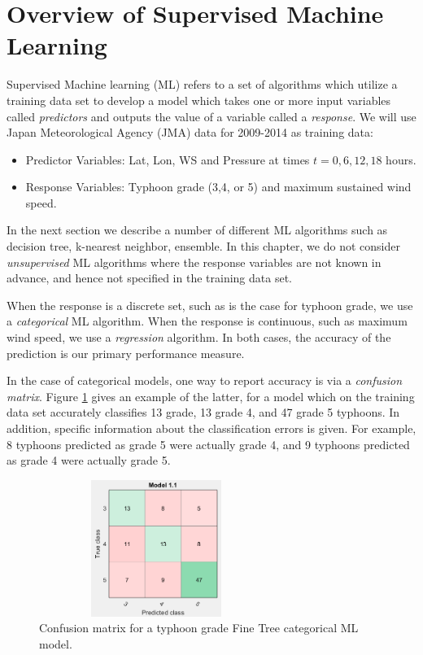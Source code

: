 \documentclass{SBCbookchapter}
\begin{document}
\section{Overview of Supervised Machine Learning}

Supervised Machine learning (ML) refers to a set of algorithms which utilize a training data set to develop a model which takes one or more input variables called \emph{predictors} and outputs the value of a variable called a \emph{response}. We will use Japan Meteorological Agency (JMA) data for 2009-2014 as training data:

\begin{itemize}
	\item Predictor Variables: Lat, Lon, WS and Pressure at times $t=0,6,12,18$ hours.
	\item Response Variables: Typhoon grade (3,4, or 5) and maximum sustained wind speed.
\end{itemize}

 {\flushleft In the} next section we describe a number of different ML algorithms such as decision tree, k-nearest neighbor, ensemble. In this chapter, we do not consider \emph{unsupervised} ML algorithms where the response variables are not known in advance, and hence not specified in the training data set.



 When the response is a discrete set, such as is the case for typhoon grade, we use a \emph{categorical} ML algorithm. When the response is continuous, such as maximum wind speed, we use a \emph{regression} algorithm.  In both cases, the accuracy of the prediction is our primary performance measure.  
 
 In the case of categorical models, one way to report accuracy is via a \emph{confusion matrix}. Figure \ref{FineTreeCategorical} gives an example of the latter, for a model which on the training data set accurately classifies 13 grade, 13 grade 4, and 47 grade 5 typhoons. In addition, specific information about the classification errors is given.  For example, 8 typhoons predicted as grade 5 were actually grade 4, and 9 typhoons predicted as grade 4 were actually grade 5. 
 
  \begin{figure}[!htpb]
  	\centering
  	\includegraphics[width=3in,height=1.75in]{TyphoonCM1.png}
  	\caption{Confusion matrix for a typhoon grade Fine Tree categorical ML model.}
  	\label{FineTreeCategorical}
  \end{figure}
  
\end{document}
